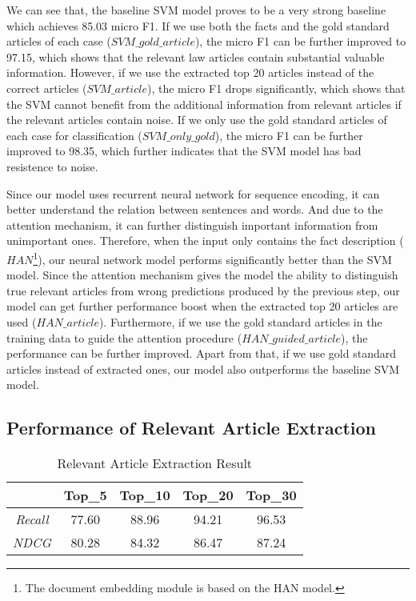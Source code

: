 We can see that, the baseline SVM model proves to be a very strong baseline which achieves 85.03 micro F1. If we use both the facts and the gold standard articles of each case ($SVM\_gold\_article$), the micro F1 can be further improved to 97.15, which shows that the relevant law articles contain substantial valuable information. However, if we use the extracted top 20 articles instead of the correct articles ($SVM\_article$), the micro F1 drops significantly, which shows that the SVM cannot benefit from the additional information from relevant articles if the relevant articles contain noise. If we only use the gold standard articles of each case for classification ($SVM\_only\_gold$), the micro F1 can be further improved to 98.35, which further indicates that the SVM model has bad resistence to noise. 

Since our model uses recurrent neural network for sequence encoding, it can better understand the relation between sentences and words. And due to the attention mechanism, it can further distinguish important information from unimportant ones. Therefore, when the input only contains the fact description ($HAN$\footnote{The document embedding module is based on the HAN model.}), our neural network model performs significantly better than the SVM model. Since the attention mechanism gives the model the ability to distinguish true relevant articles from wrong predictions produced by the previous step, our model can get further performance boost when the extracted top 20 articles are used ($HAN\_article$). Furthermore, if we use the gold standard articles in the training data to guide the attention procedure ($HAN\_guided\_article$), the performance can be further improved. Apart from that, if we use gold standard articles instead of extracted ones, our model also outperforms the baseline SVM model. 

\subsection{Performance of Relevant Article Extraction}
\begin{table}
\centering
\normalsize{
\begin{tabular}{|c|c|c|c|c|}
\hline
				& \textbf{Top\_5} 	& \textbf{Top\_10} 		& \textbf{Top\_20} 	& \textbf{Top\_30} \\
\hline
\textit{Recall} 		& 77.60			& 88.96  				& 94.21			& 96.53 	\\
\hline
\textit{NDCG} 		& 80.28			& 84.32  				& 86.47			& 87.24 	\\
\hline
\end{tabular}
}
\caption{Relevant Article Extraction Result}
\label{tab_article_extraction}
\end{table}


